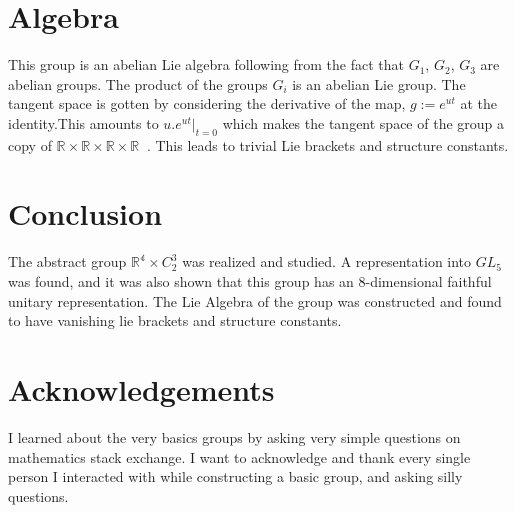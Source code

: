 \documentclass{article}
\begin{document}
\section{Algebra}
    This group is an abelian Lie algebra following from the fact that $G_1$, $G_2$,  $G_3$ are abelian groups. The product of the groups $G_i$ is an abelian Lie group. The tangent space is gotten by considering the derivative of the map, $g:= e^{ut}$ at the identity.This amounts to  $u. e^{u t}|_{t=0}$ which makes the tangent space of the group a copy of $\mathbb{R} \times \mathbb{R} \times \mathbb{R} \times \mathbb{R}\ $ \cite{4500869}. This  leads to trivial Lie brackets and structure constants.

\section{Conclusion}
 The abstract group  $\mathbb{R^4} \times C_2^3$ was realized and studied. A representation into $GL_5$ was found, and it was also shown that this group has an  8-dimensional faithful unitary representation. The Lie Algebra of the group was constructed and found to have vanishing lie brackets and structure constants.
 
\section*{Acknowledgements}

I learned about the very basics groups by asking very simple questions on mathematics stack exchange. I want to acknowledge and thank every single person I interacted with while constructing a basic group, and asking silly questions.
 
\printbibliography
\end{document}
